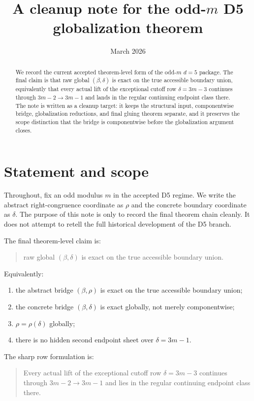 \documentclass[11pt]{article}
\title{A cleanup note for the odd-$m$ D5 globalization theorem}
\author{}
\date{March 2026}
\begin{document}
\maketitle

\begin{abstract}
We record the current accepted theorem-level form of the odd-$m$ $d=5$
package. The final claim is that raw global $(\beta,\delta)$ is exact on the
true accessible boundary union, equivalently that every actual lift of the
exceptional cutoff row $\delta=3m-3$ continues through
$3m-2\to 3m-1$ and lands in the regular continuing endpoint class there.
The note is written as a cleanup target: it keeps the structural input,
componentwise bridge, globalization reductions, and final gluing theorem
separate, and it preserves the scope distinction that the bridge is
componentwise before the globalization argument closes.
\end{abstract}

\section{Statement and scope}

Throughout, fix an odd modulus $m$ in the accepted D5 regime.
We write the abstract right-congruence coordinate as $\rho$ and the concrete
boundary coordinate as $\delta$.
The purpose of this note is only to record the final theorem chain cleanly.
It does not attempt to retell the full historical development of the D5 branch.

The final theorem-level claim is:
\begin{quote}
raw global $(\beta,\delta)$ is exact on the true accessible boundary union.
\end{quote}
Equivalently:
\begin{enumerate}[label=\textup{(\roman*)},leftmargin=2.5em]
\item the abstract bridge $(\beta,\rho)$ is exact on the true accessible
boundary union;
\item the concrete bridge $(\beta,\delta)$ is exact globally, not merely
componentwise;
\item $\rho=\rho(\delta)$ globally;
\item there is no hidden second endpoint sheet over $\delta=3m-1$.
\end{enumerate}

The sharp row formulation is:
\begin{quote}
Every actual lift of the exceptional cutoff row $\delta=3m-3$ continues through
$3m-2\to 3m-1$ and lies in the regular continuing endpoint class there.
\end{quote}
\end{document}
